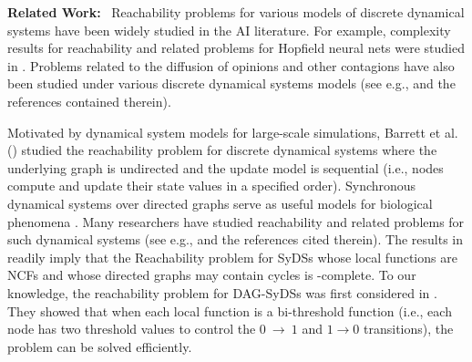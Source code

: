 \smallskip

\noindent
\textbf{Related Work:}~ Reachability problems for various
models of discrete dynamical systems have been widely studied
in the AI literature.
For example, complexity results for reachability and related problems 
for Hopfield neural nets were studied in 
\cite{FO-1989, Orponen-1993,Orponen-1994}. 
Problems related to the diffusion of opinions and other contagions have
also been studied under various discrete dynamical systems
models (see e.g., 
\cite{Auletta-etal-2018,Botan-etal-2019,Chistikov-etal-2020,BE-2017}
and the references contained therein).

Motivated by dynamical system models for large-scale simulations,
Barrett et al. (\citeyear{BH+06}) studied the reachability problem
for discrete dynamical systems where the underlying graph is 
undirected and the update model is sequential (i.e., nodes compute 
and update their state values in a specified order). 
Synchronous dynamical systems over 
directed graphs serve as useful models for biological
phenomena \cite{Kauffman-etal-2003}.
Many researchers have studied reachability and related 
problems for such dynamical systems (see e.g., 
\cite{OU-2020,OU-2017,Akutsu-etal-2007} and
the references cited therein).
The results in \cite{Rosenkrantz-etal-2018} readily imply
that the Reachability problem for SyDSs whose local
functions are NCFs and whose directed graphs may contain cycles
is \cpsp-complete.
To our knowledge, the reachability problem for DAG-SyDSs 
was first considered in \cite{KKM+2013}. 
They showed that when each local function is 
a bi-threshold function (i.e., each node has two threshold
values to control the $0 ~\rightarrow~  1$ and $1 \rightarrow 0$
transitions), the problem can be solved efficiently.

